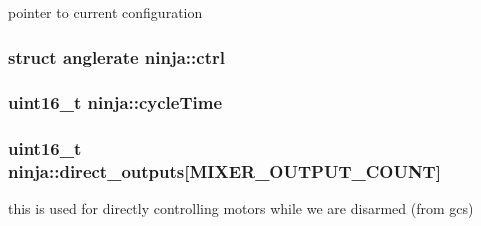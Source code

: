pointer to current configuration 

\hypertarget{structninja_a0e80ee51f27f1bfe247ab00a3641d623}{
\subsubsection[{ctrl}]{\setlength{\rightskip}{0pt plus 5cm}struct {\bf anglerate} ninja\+::ctrl}}\label{structninja_a0e80ee51f27f1bfe247ab00a3641d623}
\hypertarget{structninja_a36f7aa8b2d5dea192a529d2d64d32e88}{
\subsubsection[{cycle\+Time}]{\setlength{\rightskip}{0pt plus 5cm}uint16\+\_\+t ninja\+::cycle\+Time}}\label{structninja_a36f7aa8b2d5dea192a529d2d64d32e88}
\hypertarget{structninja_a980dd1682714d182924bfc3215442739}{
\subsubsection[{direct\+\_\+outputs}]{\setlength{\rightskip}{0pt plus 5cm}uint16\+\_\+t ninja\+::direct\+\_\+outputs\mbox{[}{\bf M\+I\+X\+E\+R\+\_\+\+O\+U\+T\+P\+U\+T\+\_\+\+C\+O\+U\+N\+T}\mbox{]}}}\label{structninja_a980dd1682714d182924bfc3215442739}


this is used for directly controlling motors while we are disarmed (from gcs) 

